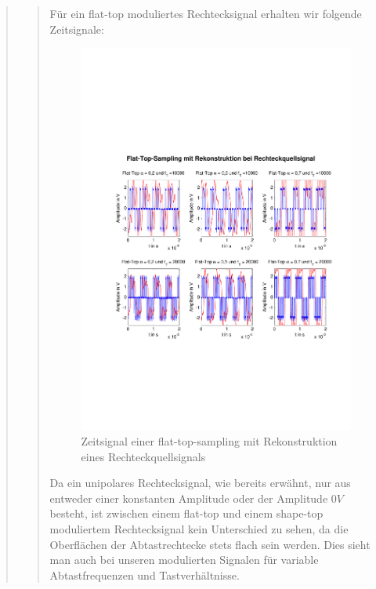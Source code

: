\begin{quote}
\begin{quote}
           
           Für ein flat-top moduliertes Rechtecksignal erhalten wir folgende
           Zeitsignale:
           
           \begin{figure}[H]
            \centering
            \includegraphics[scale=0.6, trim = 1.5cm 6cm 1cm 8cm,
            clip]{./Bilder/flat-top-recht}
                \caption{Zeitsignal einer flat-top-sampling mit Rekonstruktion
                eines Rechteckquellsignals}
      	    \end{figure}
      	    
      	    Da ein unipolares Rechtecksignal, wie bereits erwähnt, nur aus
      	    entweder einer konstanten Amplitude oder der Amplitude $0 V$ besteht,
      	    ist zwischen einem flat-top und einem shape-top moduliertem
      	    Rechtecksignal kein Unterschied zu sehen, da die Oberflächen der
      	    Abtastrechtecke stets flach sein werden. Dies sieht man auch bei
      	    unseren modulierten Signalen für variable Abtastfrequenzen und
      	    Tastverhältnisse.\\
      	    

\end{quote}
\end{quote}

